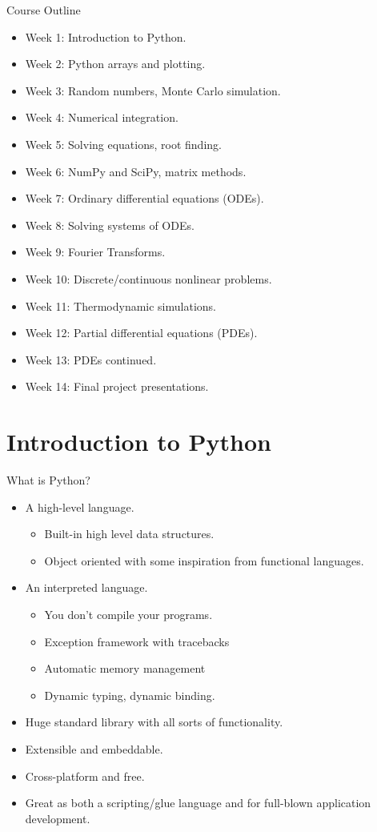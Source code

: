 \begin{frame}{Course Outline}
  \begin{itemize}
  \item Week 1: Introduction to Python.
  \item Week 2: Python arrays and plotting.
  \item Week 3: Random numbers, Monte Carlo simulation.
  \item Week 4: Numerical integration.
  \item Week 5: Solving equations, root finding.
  \item Week 6: NumPy and SciPy, matrix methods.
  \item Week 7: Ordinary differential equations (ODEs).
  \item Week 8: Solving systems of ODEs.
  \item Week 9: Fourier Transforms.
  \item Week 10: Discrete/continuous nonlinear problems.
  \item Week 11: Thermodynamic simulations.
  \item Week 12: Partial differential equations (PDEs).
  \item Week 13: PDEs continued.
  \item Week 14: Final project presentations.
  \end{itemize}
\end{frame}


\section{Introduction to Python}

\begin{frame}{What is Python?}
  \begin{itemize}
  	\item A high-level language.
  	\begin{itemize}
        \item Built-in high level data structures.
        \item Object oriented with some inspiration from functional languages.
  	\end{itemize}
    \item An interpreted language.
  	\begin{itemize}
        \item You don't compile your programs.
        \item Exception framework with tracebacks
        \item Automatic memory management
        \item Dynamic typing, dynamic binding.
  	\end{itemize}
    \item Huge standard library with all sorts of functionality.
    \item Extensible and embeddable.
    \item Cross-platform and free.
    \item Great as both a scripting/glue language and for full-blown application development.
  \end{itemize}
\end{frame}


